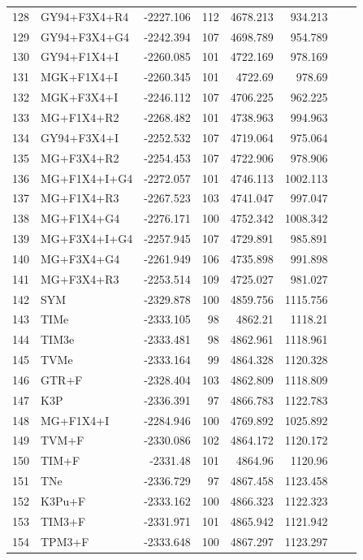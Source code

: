 \documentclass[fleqn,letterpaper]{article}
\begin{document}
\begin{longtable}{clrrrrrr}
	128 & GY94+F3X4+R4 & -2227.106 & 112 & 4678.213 & 934.213 \\ 
	129 & GY94+F3X4+G4 & -2242.394 & 107 & 4698.789 & 954.789 \\ 
	130 & GY94+F1X4+I & -2260.085 & 101 & 4722.169 & 978.169 \\ 
	131 & MGK+F1X4+I & -2260.345 & 101 & 4722.69 & 978.69 \\ 
	132 & MGK+F3X4+I & -2246.112 & 107 & 4706.225 & 962.225 \\ 
	133 & MG+F1X4+R2 & -2268.482 & 101 & 4738.963 & 994.963 \\ 
	134 & GY94+F3X4+I & -2252.532 & 107 & 4719.064 & 975.064 \\ 
	135 & MG+F3X4+R2 & -2254.453 & 107 & 4722.906 & 978.906 \\ 
	136 & MG+F1X4+I+G4 & -2272.057 & 101 & 4746.113 & 1002.113 \\ 
	137 & MG+F1X4+R3 & -2267.523 & 103 & 4741.047 & 997.047 \\ 
	138 & MG+F1X4+G4 & -2276.171 & 100 & 4752.342 & 1008.342 \\ 
	139 & MG+F3X4+I+G4 & -2257.945 & 107 & 4729.891 & 985.891 \\ 
	140 & MG+F3X4+G4 & -2261.949 & 106 & 4735.898 & 991.898 \\ 
	141 & MG+F3X4+R3 & -2253.514 & 109 & 4725.027 & 981.027 \\ 
	142 & SYM & -2329.878 & 100 & 4859.756 & 1115.756 \\ 
	143 & TIMe & -2333.105 & 98 & 4862.21 & 1118.21 \\ 
	144 & TIM3e & -2333.481 & 98 & 4862.961 & 1118.961 \\ 
	145 & TVMe & -2333.164 & 99 & 4864.328 & 1120.328 \\ 
	146 & GTR+F & -2328.404 & 103 & 4862.809 & 1118.809 \\ 
	147 & K3P & -2336.391 & 97 & 4866.783 & 1122.783 \\ 
	148 & MG+F1X4+I & -2284.946 & 100 & 4769.892 & 1025.892 \\ 
	149 & TVM+F & -2330.086 & 102 & 4864.172 & 1120.172 \\ 
	150 & TIM+F & -2331.48 & 101 & 4864.96 & 1120.96 \\ 
	151 & TNe & -2336.729 & 97 & 4867.458 & 1123.458 \\ 
	152 & K3Pu+F & -2333.162 & 100 & 4866.323 & 1122.323 \\ 
	153 & TIM3+F & -2331.971 & 101 & 4865.942 & 1121.942 \\ 
	154 & TPM3+F & -2333.648 & 100 & 4867.297 & 1123.297 \\ 

\end{longtable}
\end{document}
